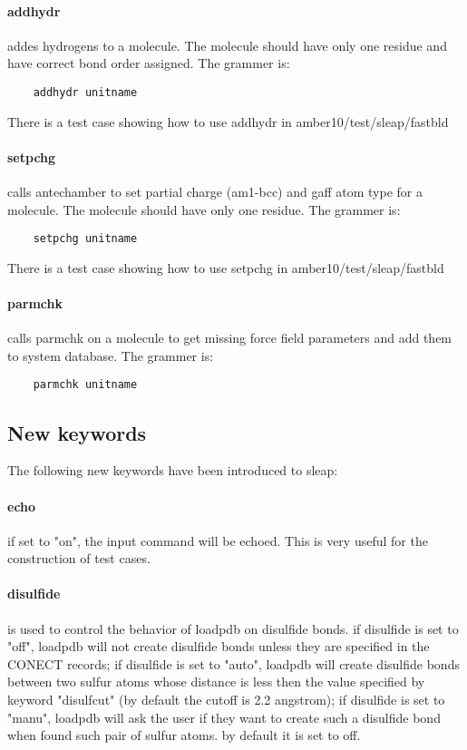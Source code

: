 \documentclass[letterpaper]{article}
\begin{document}
\paragraph{addhydr} addes hydrogens to a molecule. The molecule should have only
one residue and have correct bond order assigned. The grammer is:
\begin{lstlisting}
    addhydr unitname
\end{lstlisting}
There is a test case showing how to use addhydr in amber10/test/sleap/fastbld

\paragraph{setpchg} calls antechamber to set partial charge (am1-bcc) and gaff atom type for a
molecule. The molecule should have only one residue. The grammer is:
\begin{lstlisting}
    setpchg unitname
\end{lstlisting}
There is a test case showing how to use setpchg in amber10/test/sleap/fastbld

\paragraph{parmchk} calls parmchk on a molecule to get missing force field parameters and add 
them to system database. The grammer is:
\begin{lstlisting}
    parmchk unitname
\end{lstlisting}

\subsection{New keywords}
    The following new keywords have been introduced to sleap:

\paragraph{echo} if set to "on", the input command will be echoed. This is very useful 
for the construction of test cases.

\paragraph{disulfide} is used to control the behavior of loadpdb on disulfide bonds. 
if disulfide is set to "off", loadpdb will not create disulfide bonds unless they are
specified in the CONECT records; if disulfide is set to "auto", loadpdb will create disulfide
bonds between two sulfur atoms whose distance is less then the value specified by keyword
"disulfcut" (by default the cutoff is 2.2 angstrom); if disulfide is set to "manu", loadpdb
will ask the user if they want to create such a disulfide bond when found such pair of 
sulfur atoms. by default it is set to off.
\end{document}
